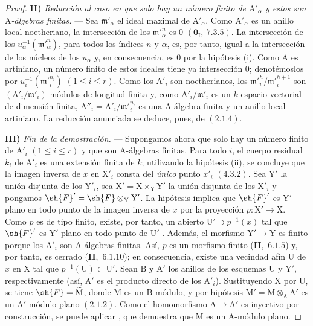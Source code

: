 \begin{proof}
\medskip
\noindent\textbf{II)} \emph{Reducción al caso en que solo hay un número finito de $\mathrm{A}'_\alpha$ y estos son $\mathrm{A}$-álgebras finitas.} --- Sea $\mathfrak{m}'_\alpha$
el ideal maximal de $\mathrm{A}'_\alpha$. Como $\mathrm{A}'_\alpha$ es un anillo local noetheriano, la intersección de los $\mathfrak{m}'^n_\alpha$
es $0$ $(\mathbf{0}_\mathrm{I},~7.3.5)$. La intersección de los $u_\alpha^{-1}(\mathfrak{m}'^n_\alpha)$, para todos los índices $n$ y $\alpha$, es, por tanto,
igual a la intersección de los núcleos de los $u_\alpha$ y, en consecuencia, es $0$ por la hipótesis (i). Como $\mathrm{A}$
es artiniano, un número finito de estos ideales tiene ya intersección $0$; denotémoslos por
$u_i^{-1}(\mathfrak{m}'^{n_i}_i)$ $(1\leq i\leq r)$. Como los $\mathrm{A}'_i$ son noetherianos, los $\mathfrak{m}'^h_i/\mathfrak{m}'^{h+1}_i$ son
$(\mathrm{A}'_i/\mathfrak{m}'_i)$-módulos de longitud finita y, como $\mathrm{A}'_i/\mathfrak{m}'_i$ es un $k$-espacio vectorial de dimensión finita,
$\mathrm{A}''_i=\mathrm{A}'_i/\mathfrak{m}'^{n_i}_i$ es una $\mathrm{A}$-álgebra finita y un anillo local artiniano. La reducción anunciada
se deduce, pues, de $(2.1.4)$.

\medskip
\noindent\textbf{III)} \emph{Fin de la demostración.} --- Supongamos ahora que solo hay un número finito de $\mathrm{A}'_i$ $(1\leq i\leq r)$ y que
son $\mathrm{A}$-álgebras finitas. Para todo $i$, el cuerpo residual $k_i$ de $\mathrm{A}'_i$ es una extensión finita de $k$; utilizando
la hipótesis (ii), se concluye que la imagen inversa de $x$ en $\mathrm{X}'_i$ consta del \emph{único} punto $x'_i$ $(4.3.2)$.
Sea $\mathrm{Y}'$ la unión disjunta de los $\mathrm{Y}'_i$, sea $\mathrm{X}'=\mathrm{X}\times_\mathrm{Y}\mathrm{Y}'$ la unión disjunta de los
$\mathrm{X}'_i$ y pongamos $\sh{F}'=\sh{F}\otimes_\mathrm{Y}\mathrm{Y}'$. La hipótesis implica que $\sh{F}'$ es $\mathrm{Y}'$-plano en todo
punto de la imagen inversa de $x$ por la proyección $p:\mathrm{X}'\to\mathrm{X}$. Como $p$ es de tipo finito, existe, por tanto, un
abierto $\mathrm{U}'\supset p^{-1}(x)$ tal que $\sh{F}'$ es $\mathrm{Y}'$-plano en todo punto de $\mathrm{U}'$ .
Además, el morfismo $\mathrm{Y}'\to\mathrm{Y}$ es finito porque los $\mathrm{A}'_i$ son $\mathrm{A}$-álgebras finitas. Así, $p$ es un
morfismo finito (\textbf{II},~$6.1.5$) y, por tanto, es cerrado (\textbf{II},~$6.1.10$); en consecuencia, existe una vecindad afín $\mathrm{U}$ de
$x$ en $\mathrm{X}$ tal que $p^{-1}(\mathrm{U})\subset\mathrm{U}'$. Sean $\mathrm{B}$ y $\mathrm{A}'$ los anillos de los esquemas
$\mathrm{U}$ y $\mathrm{Y}'$, respectivamente (así, $\mathrm{A}'$ es el producto directo de los $\mathrm{A}'_i$). Sustituyendo $\mathrm{X}$ por
$\mathrm{U}$, se tiene $\sh{F}=\widetilde{\mathrm{M}}$, donde $\mathrm{M}$ es un $\mathrm{B}$-módulo, y por hipótesis
$\mathrm{M}'=\mathrm{M}\otimes_\mathrm{A}\mathrm{A}'$ es un $\mathrm{A}'$-módulo plano $(2.1.2)$. Como el homomorfismo
$\mathrm{A}\to\mathrm{A}'$ es inyectivo por construcción, se puede aplicar , que demuestra que $\mathrm{M}$ es un
$\mathrm{A}$-módulo plano.
\end{proof}

